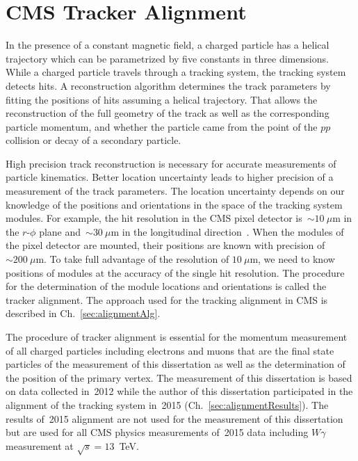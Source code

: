 \chapter{CMS Tracker Alignment} %
\label{sec:alignment}

In the presence of a constant magnetic field, a charged particle has a helical trajectory which can be parametrized by five constants in three dimensions. While a charged particle travels through a tracking system, the tracking system detects hits. A reconstruction algorithm determines the track parameters by fitting the positions of hits assuming a helical trajectory. That allows the reconstruction of the full geometry of the track as well as the corresponding particle momentum, and whether the particle came from the point of the $pp$ collision or decay of a secondary particle.

High precision track reconstruction is necessary for accurate measurements of particle kinematics. Better location uncertainty leads to higher precision of a measurement of the track parameters. The location uncertainty depends on our knowledge of the positions and orientations in the space of the tracking system modules. For example, the hit resolution in the CMS pixel detector is~$\sim10~\mu$m in the $r$-$\phi$ plane and~$\sim30~\mu$m in the longitudinal direction~\cite{ref_trackerPerformance}. When the modules of the pixel detector are mounted, their positions are known with precision of~$\sim200~\mu$m. To take full advantage of the resolution of $10~\mu$m, we need to know positions of modules at the accuracy of the single hit resolution. The procedure for the determination of the module locations and orientations is called the tracker alignment. The approach used for the tracking alignment in CMS is described in Ch.~\ref{sec:alignmentAlg}.

The procedure of tracker alignment is essential for the momentum measurement of all charged particles including electrons and muons that are the final state particles of the measurement of this dissertation as well as the determination of the position of the primary vertex. The measurement of this dissertation is based on data collected in~2012 while the author of this dissertation participated in the alignment of the tracking system in~2015 (Ch.~\ref{sec:alignmentResults}). The results of~2015 alignment are not used for the measurement of this dissertation but are used for all CMS physics measurements of~2015 data including $W\gamma$ measurement at $\sqrt{s}=13$~TeV. 

